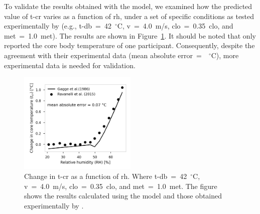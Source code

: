 To validate the results obtained with the  model, we examined how the predicted value of \ac{t-cr} varies as a function of \ac{rh}, under a set of specific conditions as tested experimentally by  (e.g., \ac{t-db}~=~42~$^{\circ}$C, \ac{v}~=~4.0~m/s, \ac{clo}~=~0.35~clo, and \ac{met}~=~1.0~met).
The results are shown in Figure~\ref{fig:comparison_ravanelli}.
It should be noted that  only reported the core body temperature of one participant.
Consequently, despite the agreement with their experimental data (mean absolute error~=~~$^{\circ}$C), more experimental data is needed for validation.


\begin{figure}[hbt!]
    \centering
    \includegraphics[width=0.5\textwidth]{figures/comparison_ravanelli}
    \caption{Change in \acf{t-cr} as a function of \acf{rh}.
    Where \ac{t-db}~=~42~$^{\circ}$C, \ac{v}~=~4.0~m/s, \ac{clo}~=~0.35~clo, and \ac{met}~=~1.0~met.
    The figure shows the results calculated using the  model and those obtained experimentally by .}
    \label{fig:comparison_ravanelli}
\end{figure}

